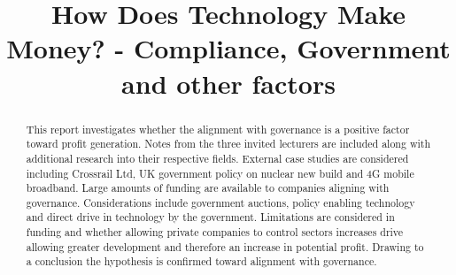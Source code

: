 \documentclass{elec6049Report}     %
\newcommand{\inote}[1] {\todo[inline]{#1}}
\begin{document}
\frontmatter
{}
\title      {How Does Technology Make Money? - Compliance, Government and other factors}

\maketitle
{}
{}
\begin{abstract}
This report investigates whether the alignment with governance is a positive factor toward profit generation.
Notes from the three invited lecturers are included along with additional research into their respective fields.
External case studies are considered including Crossrail Ltd, UK government policy on nuclear new build and 4G mobile broadband.
Large amounts of funding are available to companies aligning with governance.
Considerations include government auctions, policy enabling technology and direct drive in technology by the government.
Limitations are considered in funding and whether allowing private companies to control sectors increases drive allowing greater development and therefore an increase in potential profit. 
Drawing to a conclusion the hypothesis is confirmed toward alignment with governance.

\end{abstract}
\mainmatter





\backmatter


\newpage
\appendix



 
\end{document}
